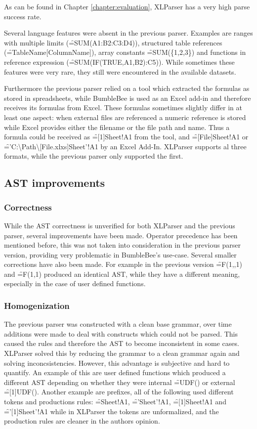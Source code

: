As can be found in Chapter \ref{chapter:evaluation}, XLParser has a very high parse success rate.

Several language features were absent in the previous parser.
Examples are ranges with multiple limits (\f{=SUM(A1:B2:C3:D4)}), structured table references (\f{=TableName[ColumnName]}), array constants \f{=SUM(\{1,2,3\})} and functions in reference expression (\f{=SUM(IF(TRUE,A1,B2):C5)}).
While sometimes these features were very rare, they still were encountered in the available datasets.

Furthermore the previous parser relied on a tool which extracted the formulas as stored in spreadsheets, while BumbleBee is used as an Excel add-in and therefore receives its formulas from Excel.
These formulas sometimes slightly differ in at least one aspect: when external files are referenced a numeric reference is stored while Excel provides either the filename or the file path and name.
Thus a formula could be received as \f{=[1]Sheet!A1} from the tool, and \f{=[File]Sheet!A1} or \f{='C:\textbackslash Path\textbackslash [File.xlxs]Sheet'!A1} by an Excel Add-In.
XLParser supports al three formats, while the previous parser only supported the first.

\subsection{AST improvements}

\subsubsection{Correctness}

While the AST correctness is unverified for both XLParser and the previous parser, several improvements have been made.
Operator precedence has been mentioned before, this was not taken into consideration in the previous parser version, providing very problematic in BumbleBee's use-case.
Several smaller corrections have also been made.
For example in the previous version \f{=F(1,,1)} and \f{=F(1,1)} produced an identical AST, while they have a different meaning, especially in the case of user defined functions.

\subsubsection{Homogenization}
The previous parser was constructed with a clean base grammar, over time additions were made to deal with constructs which could not be parsed.
This caused the rules and therefore the AST to become inconsistent in some cases.
XLParser solved this by reducing the grammar to a clean grammar again and solving inconcsistencies.
However, this advantage is subjective and hard to quantify.
An example of this are user defined functions which produced a different AST depending on whether they were internal \f{=UDF()} or external \f{=[1]UDF()}.
Another example are prefixes, all of the following used different tokens and productions rules: \f{=Sheet!A1}, \f{='Sheet'!A1}, \f{=[1]Sheet!A1} and \f{='[1]Sheet'!A1} while in XLParser the tokens are unformalized, and the production rules are cleaner in the authors opinion.

